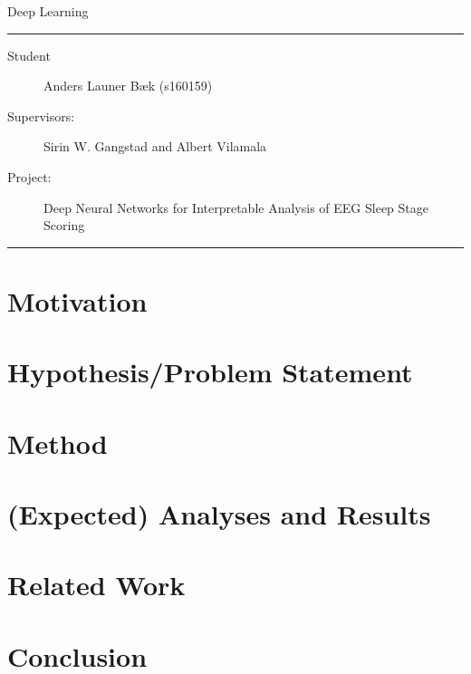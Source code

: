 \documentclass[11pt]{article}
\begin{document}
\begin{center}
{{\Large \sc Deep Learning}}
\end{center}
\rule{\textwidth}{1pt}
\begin{description}
\item[Student] Anders Launer Bæk (s160159)
\item[Supervisors:] Sirin W. Gangstad and Albert Vilamala
\item[Project:] Deep Neural Networks for Interpretable Analysis of EEG Sleep Stage Scoring
\end{description}
\rule{\textwidth}{1pt}


\section{Motivation}


\section{Hypothesis/Problem Statement}
\section{Method}
\section{(Expected) Analyses and Results}
\section{Related Work}
\section{Conclusion}

\citep{Nobody06}

\printbibliography
\end{document}
